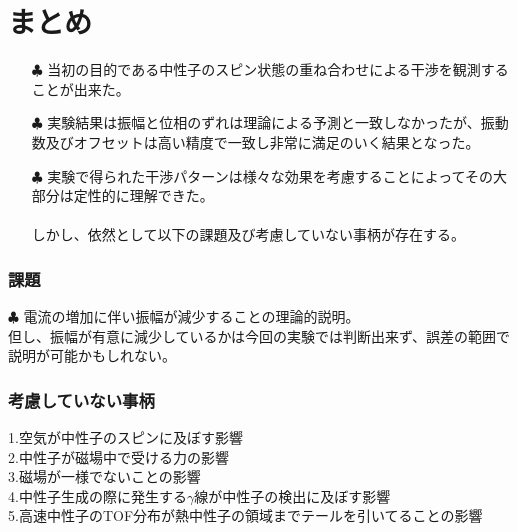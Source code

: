 
\section{まとめ}
\begin{itemize}
\item[$\clubsuit$]当初の目的である中性子のスピン状態の重ね合わせによる干渉を観測することが出来た。\\
\item[$\clubsuit$]実験結果は振幅と位相のずれは理論による予測と一致しなかったが、振動数及びオフセットは高い精度で一致し非常に満足のいく結果となった。\\
\item[$\clubsuit$]実験で得られた干渉パターンは様々な効果を考慮することによってその大部分は定性的に理解できた。\\
\\
しかし、依然として以下の課題及び考慮していない事柄が存在する。
\end{itemize}
\subsubsection{課題}
$\clubsuit$
電流の増加に伴い振幅が減少することの理論的説明。\\
但し、振幅が有意に減少しているかは今回の実験では判断出来ず、誤差の範囲で説明が可能かもしれない。\\
\subsubsection{考慮していない事柄}
\hspace{-9.5pt}1.空気が中性子のスピンに及ぼす影響\\
2.中性子が磁場中で受ける力の影響\\
3.磁場が一様でないことの影響\\
4.中性子生成の際に発生する$\gamma$線が中性子の検出に及ぼす影響\\
5.\mbox{高速中性子のTOF分布が熱中性子の領域までテールを引いてることの影響}\\
